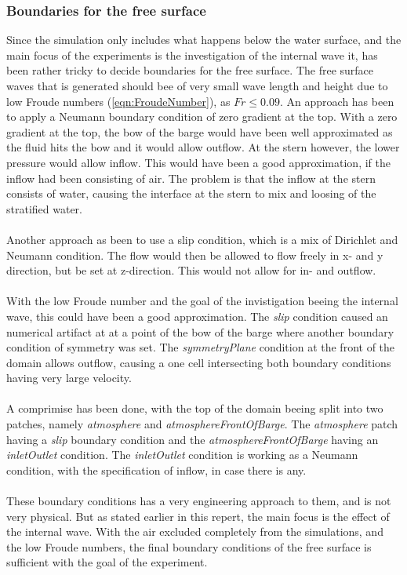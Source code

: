 \documentclass[a4paper, 12pt]{report}
\begin{document}
\subsubsection{Boundaries for the free surface}
Since the simulation only includes what happens below the water surface, and the main focus of the experiments is the investigation of the internal wave it, has been rather tricky to decide boundaries for the free surface. The free surface waves that is generated should bee of very small wave length and height due to low Froude numbers (\ref{eqn:FroudeNumber}), as $Fr \leq 0.09 $. An approach has been to apply a Neumann boundary condition of zero gradient at the top. With a zero gradient at the top, the bow of the barge would have been well approximated as the fluid hits the bow and it would allow outflow. At the stern however, the lower pressure would allow inflow. This would have been a good approximation, if the inflow had been consisting of air. The problem is that the inflow at the stern consists of water, causing the interface at the stern to mix and loosing of the stratified water. \\
\\
Another approach as been to use a slip condition, which is a mix of Dirichlet and Neumann condition. The flow would then be allowed to flow freely in x- and y direction, but be set at z-direction. This would not allow for in- and outflow.\\
\\
With the low Froude number and the goal of the invistigation beeing the internal wave, this could have been a good approximation. The \textit{slip} condition caused an numerical artifact at at a point of the bow of the barge where another boundary condition of symmetry was set. The \textit{symmetryPlane} condition at the front of the domain allows outflow, causing a one cell intersecting both boundary conditions having very large velocity.\\
\\
A comprimise has been done, with the top of the domain beeing split into two patches, namely \textit{atmosphere} and \textit{atmosphereFrontOfBarge}. The \textit{atmosphere} patch having a \textit{slip} boundary condition and the \textit{atmosphereFrontOfBarge} having an \textit{inletOutlet} condition. The \textit{inletOutlet} condition is working as a Neumann condition, with the specification of inflow, in case there is any. \\
\\
These boundary conditions has a very engineering approach to them, and is not very physical. But as stated earlier in this repert, the main focus is the effect of the internal wave. With the air excluded completely from the simulations, and the low Froude numbers, the final boundary conditions of the free surface is sufficient with the goal of the experiment.
\end{document}
